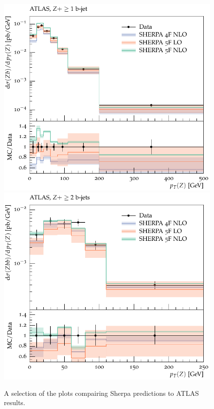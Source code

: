 \documentclass[11pt]{cernrep} \usepackage{graphicx,epsfig} 
\begin{document}
\begin{figure}[htbp]
\begin{center}
   \includegraphics[scale=0.65]{figs/zbb/sherpa/d15-x01-y01.pdf} 
   \includegraphics[scale=0.65]{figs/zbb/sherpa/d25-x01-y01.pdf} 
\caption{A selection of the plots compairing Sherpa predictions to ATLAS results.}
\label{zbb-sherpa-atlas}
\end{center}
\end{figure}
\end{document}
